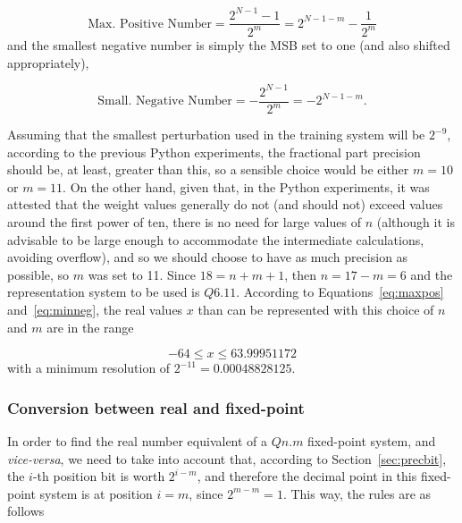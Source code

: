 \begin{equation}\label{eq:maxpos}
    \text{Max. Positive Number} = \frac{2^{N-1}-1}{2^m} = 2^{N-1-m} - \frac{1}{2^m}
\end{equation}
and the smallest negative number is simply the MSB set to one (and also shifted appropriately),

\begin{equation}\label{eq:minneg}
    \text{Small. Negative Number} = -\frac{2^{N-1}}{2^m} = -2^{N-1-m}.
\end{equation}

Assuming that the smallest perturbation used in the training system will be $2^{-9}$, according to the previous Python experiments, the fractional part precision should be,
at least, greater than this, so a sensible choice would be either $m=10$ or $m=11$. On the other hand, given that, in the Python experiments, it was attested that the
weight values generally do not (and should not) exceed values around the first power of ten, there is no need for large values of $n$ (although it is advisable to be large
enough to accommodate the intermediate calculations, avoiding overflow), and so we should choose to have as much precision as possible, so $m$ was set to 11. Since $18=n+m+1$, then
$n = 17 - m = 6$ and the representation system to be used is $Q6.11$. According to Equations~\ref{eq:maxpos} and~\ref{eq:minneg}, the real values $x$ than can be represented
with this choice of $n$ and $m$ are in the range

\begin{equation}\label{eq:rangeQ611}
    -64 \leq x \leq 63.99951172
\end{equation}
with a minimum resolution of $2^{-11} = 0.00048828125$.

\subsubsection{Conversion between real and fixed-point}\label{sec:convrulesfp}
In order to find the real number equivalent of a $Qn.m$ fixed-point system, and \textit{vice-versa}, we need to take into account that, according to
Section~\ref{sec:precbit}, the $i$-th position bit is worth $2^{i-m}$, and therefore the decimal point in this fixed-point system is at position $i=m$, since $2^{m-m} = 1$.
This way, the rules are as follows

